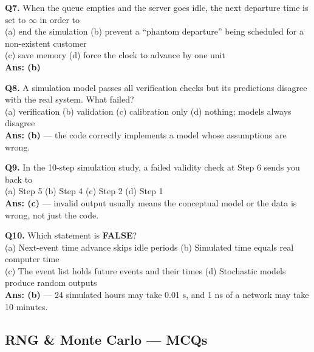\begin{mcqbox}
\textbf{Q7.} When the queue empties and the server goes idle, the next departure time is set to $\infty$ in order to\\
(a) end the simulation \quad (b) prevent a ``phantom departure'' being scheduled for a non-existent customer\\
(c) save memory \quad (d) force the clock to advance by one unit\\
\textbf{Ans: (b)}

\textbf{Q8.} A simulation model passes all verification checks but its predictions disagree with the real system. What failed?\\
(a) verification \quad (b) validation \quad (c) calibration only \quad (d) nothing; models always disagree\\
\textbf{Ans: (b)} --- the code correctly implements a model whose assumptions are wrong.

\textbf{Q9.} In the 10-step simulation study, a failed validity check at Step 6 sends you back to\\
(a) Step 5 \quad (b) Step 4 \quad (c) Step 2 \quad (d) Step 1\\
\textbf{Ans: (c)} --- invalid output usually means the conceptual model or the data is wrong, not just the code.

\textbf{Q10.} Which statement is \textbf{FALSE}?\\
(a) Next-event time advance skips idle periods \quad (b) Simulated time equals real computer time\\
(c) The event list holds future events and their times \quad (d) Stochastic models produce random outputs\\
\textbf{Ans: (b)} --- 24 simulated hours may take 0.01 s, and 1 ns of a network may take 10 minutes.
\end{mcqbox}

\subsection{RNG \& Monte Carlo --- MCQs}

